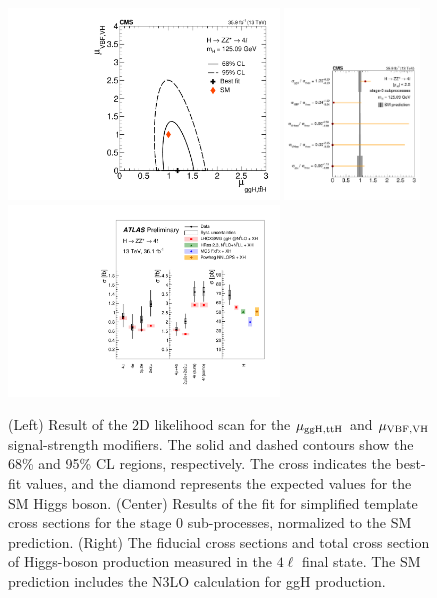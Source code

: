 \documentclass[10pt]{article}
\begin{document}
\begin{figure}[htb]
\centering
\includegraphics[height=2in]{figures/CMS-HIG-16-041_Figure_008-c.pdf}
\includegraphics[height=2in]{figures/CMS-HIG-16-041_Figure_009.pdf}
\includegraphics[height=2in]{figures/ATLAS-HIGG-2016-25__fig_07__xs.pdf}
\caption{
  (Left) Result of the 2D likelihood scan for the ${\rm \mu_{ggH,ttH}}$
  and ${\rm \mu_{VBF,VH}}$ signal-strength modifiers. The solid and dashed
  contours show the 68\% and 95\% CL regions, respectively. The cross
  indicates the best-fit values, and the diamond represents the expected
  values for the SM Higgs boson.
  (Center) Results of the fit for simplified template cross sections for
  the stage 0 sub-processes, normalized to the SM prediction.
  (Right) The fiducial cross sections and total cross
  section of Higgs-boson production measured in the $4\ell$
  final state. The SM prediction includes the N3LO calculation for ggH
  production.
}
\label{fig:figure-ZZ-2}
\end{figure}
\end{document}
